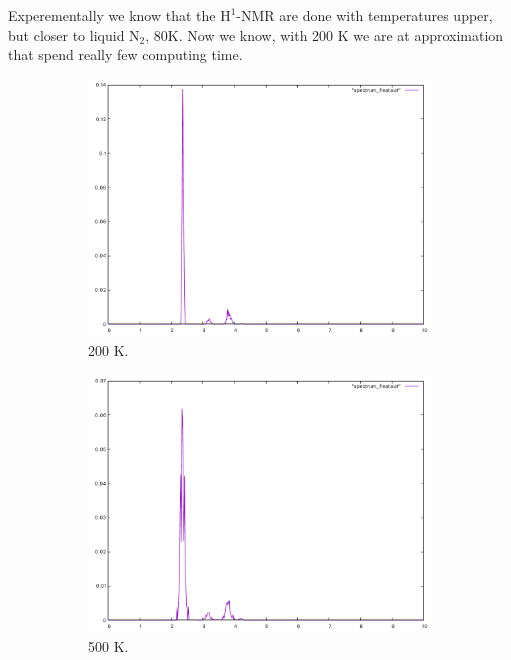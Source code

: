 Experementally we know that the $\mathrm{H^1}$-NMR are done with temperatures
upper, but closer to liquid $\mathrm{N}_2$, $80 \mathrm{K}$. Now we know, with 200 K we
are at approximation that spend really few computing time.

\begin{figure}[h]
\centering
\begin{subfigure}[b]{0.48\linewidth}
\includegraphics[width=\linewidth]{./img/spectra_a}
\caption{200 K.}
\end{subfigure}
\begin{subfigure}[b]{0.48\linewidth}
\includegraphics[width=\linewidth]{./img/spectra_b}
\caption{500 K.}
\end{subfigure}
\begin{subfigure}[b]{0.48\linewidth}

\end{subfigure}
\end{figure}
